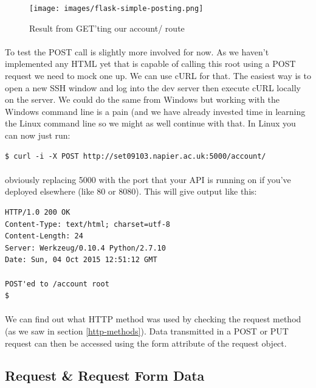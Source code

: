 \documentclass[12pt, a4paper, oneside]{book}
\begin{document}
{\begin{figure}[H]
\centering
\texttt{[image: images/flask-simple-posting.png]}
\caption{Result from GET'ting our account/ route}
\label{fig:flask-simple-posting}
\end{figure}


\paragraph{} To test the POST call is slightly more involved for now. As we haven't implemented any HTML yet that is capable of calling this root using a POST request we need to mock one up. We can use cURL for that. The easiest way is to open a new SSH window and log into the dev server then execute cURL locally on the server. We could do the same from Windows but working with the Windows command line is a pain (and we have already invested time in learning the Linux command line so we might as well continue with that. In Linux you can now just run:

\begin{lstlisting}[style=DOS]
$ curl -i -X POST http://set09103.napier.ac.uk:5000/account/
\end{lstlisting}

\paragraph{} obviously replacing 5000 with the port that your API is running on if you've deployed elsewhere (like 80 or 8080). This will give output like this:

\begin{lstlisting}[style=DOS]
HTTP/1.0 200 OK
Content-Type: text/html; charset=utf-8
Content-Length: 24
Server: Werkzeug/0.10.4 Python/2.7.10
Date: Sun, 04 Oct 2015 12:51:12 GMT

POST'ed to /account root
$ 
\end{lstlisting}

\paragraph{} We can find out what HTTP method was used by checking the request method (as we saw in section \ref{http-methods}). Data transmitted in a POST or PUT request can then be accessed using the form attribute of the request object.

\subsection{Request \& Request Form Data}
\label{requests-objects-and-form-data}
}
\end{document}
